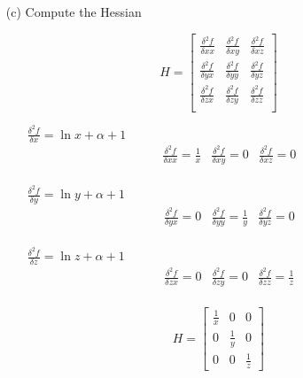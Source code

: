 \begin{enumerate}
\begin{enumerate}
			\item[(c)] Compute the Hessian
			
			\[
				H =  \left[ \begin{array}{ccc}
						\frac{\delta^2 f}{\delta xx} & \frac{\delta^2 f}{\delta xy} & \frac{\delta^2 f}{\delta xz} \\
						\frac{\delta^2 f}{\delta yx} & \frac{\delta^2 f}{\delta yy} & \frac{\delta^2 f}{\delta yz} \\
						\frac{\delta^2 f}{\delta zx} & \frac{\delta^2 f}{\delta zy} & \frac{\delta^2 f}{\delta zz} \\
					       \end{array} 
					\right]
			\]
			\vspace*{4mm}
			\begin{enumerate}
				\item[\( \frac{\delta^2 f}{\delta x} = \ln x + \alpha + 1 \) ]
				\[
					\begin{array}{ccc}
						\frac{ \delta^2 f }{\delta x x} = \frac{1}{x} & \frac{ \delta^2 f }{\delta x y} = 0 & \frac{ \delta^2 f }{\delta x z} = 0 \\
					\end{array}
				\]
				\item[\( \frac{\delta^2 f}{\delta y} = \ln y + \alpha + 1 \) ]
				\[
					\begin{array}{ccc}
						\frac{ \delta^2 f }{\delta y x} = 0 & \frac{ \delta^2 f }{\delta y y} = \frac{1}{y} & \frac{ \delta^2 f }{\delta y z} = 0 \\
					\end{array}
				\]
				\item[\( \frac{\delta^2 f}{\delta z} = \ln z + \alpha + 1 \) ]
				\[
					\begin{array}{ccc}
						\frac{ \delta^2 f }{\delta z x} = 0 & \frac{ \delta^2 f }{\delta z y} = 0 & \frac{ \delta^2 f }{\delta z z} = \frac{1}{z} \\
					\end{array}
				\]
			\end{enumerate}
			\vspace*{4mm}
			\vspace*{4mm}
			\[
				H =  \left[ \begin{array}{ccc}
						\frac{1}{x} & 0 & 0 \\
						0 & \frac{1}{y} & 0 \\
						0 & 0 & \frac{1}{z}
					       \end{array} 
					\right]
			\]
		\end{enumerate}
\end{enumerate}






